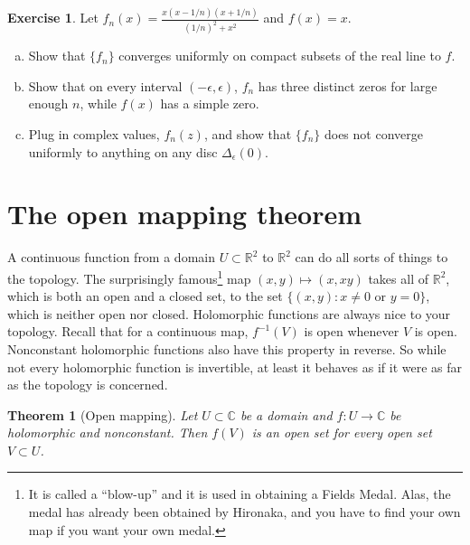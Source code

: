 \documentclass[12pt,openany]{book}
\newcommand{\C}{{\mathbb{C}}}
\newcommand{\R}{{\mathbb{R}}}
\newcommand{\myquote}[1]{``#1''}
\theoremstyle{plain}
\newtheorem{thm}{Theorem}[section]
\theoremstyle{remark}
\theoremstyle{definition}
\newenvironment{exbox}{%
    \def\FrameCommand{\vrule width 1pt \relax\hspace{10pt}}%
    \MakeFramed{\advance\hsize-\width\FrameRestore}%
}{%
    \endMakeFramed
}
\newenvironment{exparts}{%
    \leavevmode\begin{enumerate}[a),noitemsep,topsep=0pt,parsep=0pt,partopsep=0pt]
}{%
    \end{enumerate}
}
\theoremstyle{exercise}
\newtheorem{exercise}{Exercise}[section]
\theoremstyle{example}
\begin{document}
\begin{exbox}
\begin{exercise}
Let $f_n(x) = \frac{x(x-1/n)(x+1/n)}{{(1/n)}^2+x^2}$ and $f(x)=x$.
\begin{exparts}
\item
Show that $\{ f_n \}$ converges uniformly on compact subsets of the real
line to $f$.
\item
Show that on every interval $(-\epsilon,\epsilon)$, $f_n$ has three distinct zeros
for large enough $n$, while $f(x)$ has a simple zero.
\item
Plug in complex values, $f_n(z)$, and show that $\{ f_n \}$ does not
converge uniformly to anything on any disc $\Delta_{\epsilon}(0)$.
\end{exparts}
\end{exercise}
\end{exbox}


\section{The open mapping theorem}

A continuous function from a domain $U \subset \R^2$ to $\R^2$ can do all
sorts of things to the topology.  The surprisingly famous\footnote{%
It is called a \myquote{blow-up} and it is used in obtaining a Fields Medal.
Alas, the medal has already been obtained by Hironaka, and you
have to find your own map if you want your own medal.}
map $(x,y) \mapsto (x,xy)$
takes all of $\R^2$, which is both an open and a closed set, to the
set $\bigl\{ (x,y) : x \neq 0 \text{ or } y=0 \bigr\}$, which is neither open nor
closed.
Holomorphic functions are always nice to your topology.
Recall that for a continuous map, $f^{-1}(V)$ is open whenever
$V$ is open.  Nonconstant holomorphic functions also have this property in
reverse.  So while not every holomorphic function is invertible, at least it
behaves as if it were as far as the topology is concerned.


\begin{thm}[Open mapping]\label{thm:OMT}
Let $U \subset \C$ be a domain and $f \colon U \to \C$ be
holomorphic and nonconstant.  Then $f(V)$ is an open set for every open set
$V \subset U$.
\end{thm}
\end{document}
